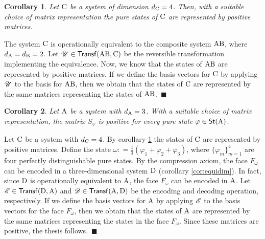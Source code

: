 \documentclass[12pt,aps,pra,showpacs,groupedaddress]{revtex4-1}
\newtheorem{corollary}{Corollary} \newtheorem{theorem}{Theorem}
\def\Proof{\medskip\par\noindent{\bf Proof. }}
\def\qed{$\,\blacksquare$\par}
\def\rB{{\rm B}}
\def\rC{{\rm C}}
\def\rD{{\rm D}} \def\rE{{\rm E}}
\def\Stset{{\mathsf{St}}}
\def\Trnset{{\mathsf{Transf}}}
\begin{document}
\begin{corollary}\label{cor:posfour1}
Let $\rC$ be a system of dimension $d_\rC = 4$.  Then, with a suitable choice of matrix representation the pure states of $\rC$ are represented by positive matrices.
\end{corollary}
\Proof The system $\rC$ is operationally equivalent to the composite system $\rA\rB$, where $d_\rA = d_\rB =2$.  Let $\tU \in \Trnset(\rA\rB, \rC)$ be the reversible transformation implementing the equivalence. Now, we know that the states of $\rA\rB$ are represented by positive matrices.  If we define the basis vectors for $\rC$ by applying $\mathscr U$ to the basis for $\rA\rB$, then we obtain that the states of $\rC$ are represented by the same matrices representing the states of $\rA\rB$. \qed 


\begin{corollary}
  Let ${\rm A}$ be a system with $d_{\rm A} = 3$. With a suitable choice of matrix representation, the matrix
  $S_\varphi$ is positive for every pure state $\varphi\in\Stset(\rA)$.  \label{cor:posthree}
\end{corollary}

\Proof Let $\rC$ be a system with $d_\rC = 4$. By corollary
\ref{cor:posfour1} the states of $\rC$ are represented by positive
matrices.  Define the state $\omega: = \frac 1 3 (\varphi_{1} +
\varphi_{2} + \varphi_{3} )$, where $\{\varphi_m\}_{m=1}^4$ are four
perfectly distinguishable pure states.  By the compression axiom, the
face $F_\omega$ can be encoded in a three-dimensional system $\rD$ (corollary \ref{cor:equidim}). In
fact, since $\rD$ is operationally equivalent to ${\rm A}$, the face
$F_\omega$ can be encoded in ${\rm A}$.  Let $\tE \in \Trnset (\rD,\rA)$
and $\tD \in\Trnset( \rA,\rD)$ be the encoding and decoding operation,
respectively.  If we define the basis vectors for ${\rm A}$ by applying
$\mathscr E$ to the basis vectors for the face $F_{\omega}$,
then we obtain that the states of ${\rm A}$ are represented by the same
matrices representing the states in the face $F_\omega$. Since these
matrices are positive, the thesis follows. \qed
\end{document}
